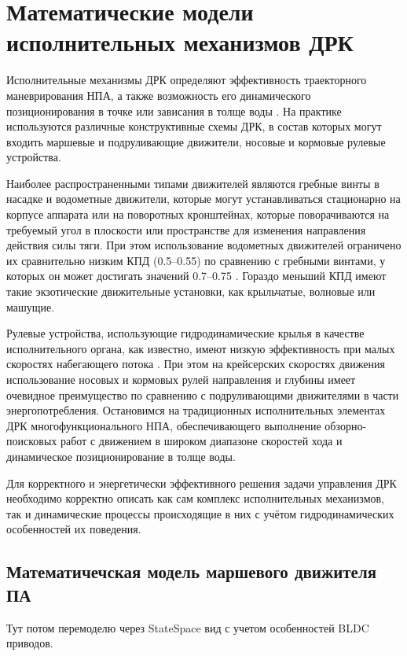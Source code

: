 \chapter{Математические модели исполнительных механизмов ДРК}\label{ch:Propulsion}

Исполнительные механизмы ДРК определяют эффективность траекторного маневрирования НПА, а также возможность его динамического позиционирования в точке или зависания в толще воды \cite{костенко2017оценка}.
На практике используются различные конструктивные схемы ДРК, в состав которых могут входить маршевые и подруливающие движители, носовые и кормовые рулевые устройства.

Наиболее распространенными типами движителей являются гребные винты в насадке и водометные движители, которые могут устанавливаться стационарно на корпусе аппарата или на поворотных кронштейнах, которые поворачиваются на требуемый угол в плоскости или пространстве для изменения направления действия силы тяги.
При этом использование водометных движителей ограничено их сравнительно низким КПД (0.5–0.55) по сравнению с гребными винтами, у которых он может достигать значений 0.7–0.75 \cite{инзарцев2018подводные}. Гораздо меньший КПД имеют такие экзотические движительные установки, как крыльчатые, волновые или машущие. 

Рулевые устройства, использующие гидродинамические крылья в качестве исполнительного органа, как известно, имеют низкую эффективность при малых скоростях набегающего потока \cite{агеев2015авто}.
При этом на крейсерских скоростях движения использование носовых и кормовых рулей направления и глубины имеет очевидное преимущество по сравнению с подруливающими движителями в части энергопотребления.
Остановимся на традиционных исполнительных элементах ДРК многофункционального НПА, обеспечивающего выполнение обзорно-поисковых работ с движением в широком диапазоне скоростей хода и динамическое позиционирование в толще воды.

Для корректного и энергетически эффективного решения задачи управления ДРК необходимо корректно описать как сам комплекс исполнительных механизмов, так и динамические процессы происходящие в них с учётом гидродинамических особенностей их поведения.

\section{Математичечская модель маршевого движителя ПА}

\begin{noteplan}
	Тут потом перемоделю через StateSpace вид с учетом особенностей BLDC приводов.
\end{noteplan}

